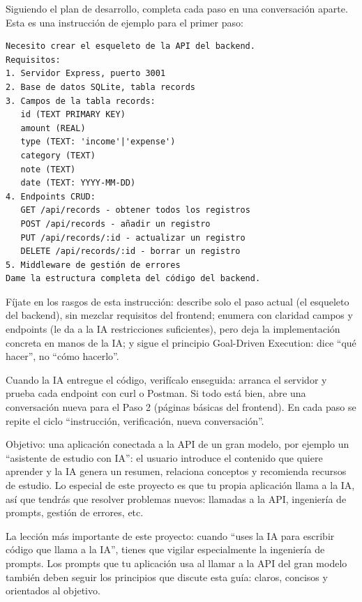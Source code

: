 
Siguiendo el plan de desarrollo, completa cada paso en una conversación aparte. Esta es una instrucción de ejemplo para el primer paso:

\begin{lstlisting}
Necesito crear el esqueleto de la API del backend.
Requisitos:
1. Servidor Express, puerto 3001
2. Base de datos SQLite, tabla records
3. Campos de la tabla records:
   id (TEXT PRIMARY KEY)
   amount (REAL)
   type (TEXT: 'income'|'expense')
   category (TEXT)
   note (TEXT)
   date (TEXT: YYYY-MM-DD)
4. Endpoints CRUD:
   GET /api/records - obtener todos los registros
   POST /api/records - añadir un registro
   PUT /api/records/:id - actualizar un registro
   DELETE /api/records/:id - borrar un registro
5. Middleware de gestión de errores
Dame la estructura completa del código del backend.
\end{lstlisting}

Fíjate en los rasgos de esta instrucción: describe solo el paso actual (el esqueleto del backend), sin mezclar requisitos del frontend; enumera con claridad campos y endpoints (le da a la IA restricciones suficientes), pero deja la implementación concreta en manos de la IA; y sigue el principio Goal-Driven Execution: dice “qué hacer”, no “cómo hacerlo”.

Cuando la IA entregue el código, verifícalo enseguida: arranca el servidor y prueba cada endpoint con curl o Postman. Si todo está bien, abre una conversación nueva para el Paso 2 (páginas básicas del frontend). En cada paso se repite el ciclo “instrucción, verificación, nueva conversación”.



Objetivo: una aplicación conectada a la API de un gran modelo, por ejemplo un “asistente de estudio con IA”: el usuario introduce el contenido que quiere aprender y la IA genera un resumen, relaciona conceptos y recomienda recursos de estudio. Lo especial de este proyecto es que tu propia aplicación llama a la IA, así que tendrás que resolver problemas nuevos: llamadas a la API, ingeniería de prompts, gestión de errores, etc.

La lección más importante de este proyecto: cuando “uses la IA para escribir código que llama a la IA”, tienes que vigilar especialmente la ingeniería de prompts. Los prompts que tu aplicación usa al llamar a la API del gran modelo también deben seguir los principios que discute esta guía: claros, concisos y orientados al objetivo.


